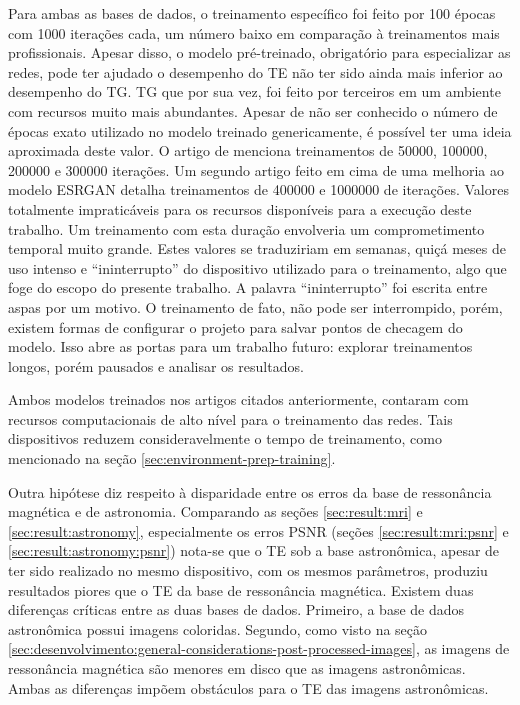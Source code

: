 Para ambas as bases de dados, o treinamento específico foi feito por 100 épocas com 1000 iterações cada, um número baixo em comparação à treinamentos mais profissionais. Apesar disso, o modelo pré-treinado, obrigatório para especializar as redes, pode ter ajudado o desempenho do TE não ter sido ainda mais inferior ao desempenho do TG. TG que por sua vez, foi feito por terceiros em um ambiente com recursos muito mais abundantes. Apesar de não ser conhecido o número de épocas exato utilizado no modelo treinado genericamente, é possível ter uma ideia aproximada deste valor. O artigo de \cite{wang_esrgan_2018} menciona treinamentos de 50000, 100000, 200000 e 300000 iterações. Um segundo artigo feito em cima de uma melhoria ao modelo ESRGAN \cite{wang_real-esrgan_2021} detalha treinamentos de 400000 e 1000000 de iterações. Valores totalmente impraticáveis para os recursos disponíveis para a execução deste trabalho. Um treinamento com esta duração envolveria um comprometimento temporal muito grande. Estes valores se traduziriam em semanas, quiçá meses de uso intenso e ``ininterrupto'' do dispositivo utilizado para o treinamento, algo que foge do escopo do presente trabalho. A palavra ``ininterrupto'' foi escrita entre aspas por um motivo. O treinamento de fato, não pode ser interrompido, porém, existem formas de configurar o projeto para salvar pontos de checagem do modelo. Isso abre as portas para um trabalho futuro: explorar treinamentos longos, porém pausados e analisar os resultados.

Ambos modelos treinados nos artigos citados anteriormente, contaram com recursos computacionais de alto nível para o treinamento das redes. Tais dispositivos reduzem consideravelmente o tempo de treinamento, como mencionado na seção \ref{sec:environment-prep-training}. 

Outra hipótese diz respeito à disparidade entre os erros da base de ressonância magnética e de astronomia. Comparando as seções \ref{sec:result:mri} e \ref{sec:result:astronomy}, especialmente os erros PSNR (seções \ref{sec:result:mri:psnr} e \ref{sec:result:astronomy:psnr}) nota-se que o TE sob a base astronômica, apesar de ter sido realizado no mesmo dispositivo, com os mesmos parâmetros, produziu resultados piores que o TE da base de ressonância magnética. Existem duas diferenças críticas entre as duas bases de dados. Primeiro, a base de dados astronômica possui imagens coloridas. Segundo, como visto na seção \ref{sec:desenvolvimento:general-considerations-post-processed-images}, as imagens de ressonância magnética são menores em disco que as imagens astronômicas. Ambas as diferenças impõem obstáculos para o TE das imagens astronômicas. 

